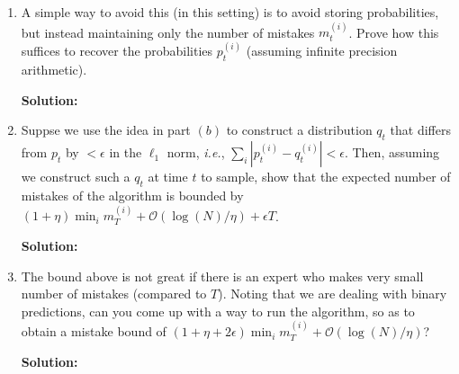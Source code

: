 \documentclass[12pt]{article}
\newcommand{\abs}[1]{\left| #1 \right|}
\newcommand{\BigO}[1]{\mathcal{O}\left( #1 \right)}
\begin{document}
\begin{enumerate}
\begin{enumerate}
      {\bf Solution:}

\item A simple way to avoid this (in this setting) is to avoid storing probabilities, but instead maintaining only the number of mistakes $m_{t}^{(i)}$. Prove how this suffices to recover the probabilities $p_{t}^{(i)}$ (assuming infinite precision arithmetic).

      {\bf Solution:}

\item Suppse we use the idea in part $(b)$ to construct a distribution $q_{t}$ that differs from $p_{t}$ by $< \epsilon$ in the $\ell_{1}$ norm, {\em i.e.}, $\sum_{i}\abs{p_{t}^{(i)} - q_{t}^{(i)}} < \epsilon$. Then, assuming we construct such a $q_{t}$ at time $t$ to sample, show that the expected number of mistakes of the algorithm is bounded by $(1 + \eta)\min_{i}m_{T}^{(i)} + \BigO{\log(N)/\eta} + \epsilon T$.

      {\bf Solution:}

\item The bound above is not great if there is an expert who makes very small number of mistakes (compared to $T$). Noting that we are dealing with binary predictions, can you come up with a way to run the algorithm, so as to obtain a mistake bound of $\left( 1 + \eta + 2\epsilon\right)\min_{i}m_{T}^{(i)} + \BigO{\log(N)/\eta}$?

      {\bf Solution:}

\end{enumerate}
\end{enumerate}
 
\end{document}
